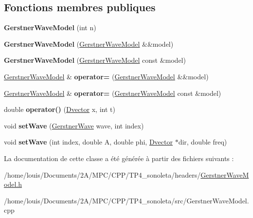 \subsection*{Fonctions membres publiques}
\begin{DoxyCompactItemize}
\item 
\mbox{\label{class_gerstner_wave_model_ab600b7a3f7455d94ff0069fa47b355bc}} 
{\bfseries Gerstner\+Wave\+Model} (int n)
\item 
\mbox{\label{class_gerstner_wave_model_adc09d3aaaee69d0e66d776d93c807d37}} 
{\bfseries Gerstner\+Wave\+Model} (\hyperlink{class_gerstner_wave_model}{Gerstner\+Wave\+Model} \&\&model)
\item 
\mbox{\label{class_gerstner_wave_model_afa36f5bb46de8f5be4b12d2b4e22cefb}} 
{\bfseries Gerstner\+Wave\+Model} (\hyperlink{class_gerstner_wave_model}{Gerstner\+Wave\+Model} const \&model)
\item 
\mbox{\label{class_gerstner_wave_model_a368e6ba6e59bb5ae666ddd3b11166f49}} 
\hyperlink{class_gerstner_wave_model}{Gerstner\+Wave\+Model} \& {\bfseries operator=} (\hyperlink{class_gerstner_wave_model}{Gerstner\+Wave\+Model} \&\&model)
\item 
\mbox{\label{class_gerstner_wave_model_ae57c58cad23189d3ddb97d7520c01341}} 
\hyperlink{class_gerstner_wave_model}{Gerstner\+Wave\+Model} \& {\bfseries operator=} (\hyperlink{class_gerstner_wave_model}{Gerstner\+Wave\+Model} const \&model)
\item 
\mbox{\label{class_gerstner_wave_model_adcb19023f2870c90d7d3efb85f975cc8}} 
double {\bfseries operator()} (\hyperlink{class_dvector}{Dvector} x, int t)
\item 
\mbox{\label{class_gerstner_wave_model_ac16a0da52167986f36eb40c378f38916}} 
void {\bfseries set\+Wave} (\hyperlink{class_gerstner_wave}{Gerstner\+Wave} wave, int index)
\item 
\mbox{\label{class_gerstner_wave_model_a4cf80a87d7766e3a03f28915132b279a}} 
void {\bfseries set\+Wave} (int index, double A, double phi, \hyperlink{class_dvector}{Dvector} $\ast$dir, double freq)
\end{DoxyCompactItemize}


La documentation de cette classe a été générée à partir des fichiers suivants \+:\begin{DoxyCompactItemize}
\item 
/home/louis/\+Documents/2\+A/\+M\+P\+C/\+C\+P\+P/\+T\+P4\+\_\+sonoleta/headers/\hyperlink{_gerstner_wave_model_8h}{Gerstner\+Wave\+Model.\+h}\item 
/home/louis/\+Documents/2\+A/\+M\+P\+C/\+C\+P\+P/\+T\+P4\+\_\+sonoleta/src/Gerstner\+Wave\+Model.\+cpp\end{DoxyCompactItemize}
